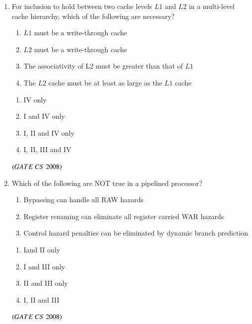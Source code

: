 \documentclass[journal, onecolumn]{IEEEtran}
\numberwithin{equation}{enumi}
\numberwithin{figure}{enumi}
\begin{document}
\begin{enumerate}
\item For inclusion to hold between two cache levels $L1$ and $L2$ in a multi-level cache hierarchy, which of the following are necessary?
\begin{enumerate} [label=\Roman*.]
   \item $L1$ must be a write-through cache
   \item $L2$ must be a write-through cache
   \item The associativity of L2 must be greater than that of $L1$
   \item The $L2$ cache must be at least as large as the $L1$ cache
\end{enumerate}
\vspace{-1em}%
\begin{multicols}{2}
\begin{enumerate}
   \item  IV only
   \item  I and IV only
   \item  I, II and IV only
   \item  I, II, III and IV
\end{enumerate}
\end{multicols}
\hfill $\left(GATE\ CS\  2008\right)$

\item Which of the following are NOT true in a pipelined processor?
\begin{enumerate} [label=\Roman*.]
   \item Bypassing can handle all RAW hazards 
   \item Register renaming can eliminate all register carried WAR hazards
   \item Control hazard penalties can be eliminated by dynamic branch prediction
\end{enumerate}
\vspace{-1em}%
\begin{multicols}{4}
\begin{enumerate}
   \item  Iand II only
   \item  I and III only
   \item  II and III only
   \item  I, II and III
\end{enumerate}
\end{multicols}
\hfill $\left(GATE\ CS\  2008\right)$


\end{enumerate}
\end{document}
